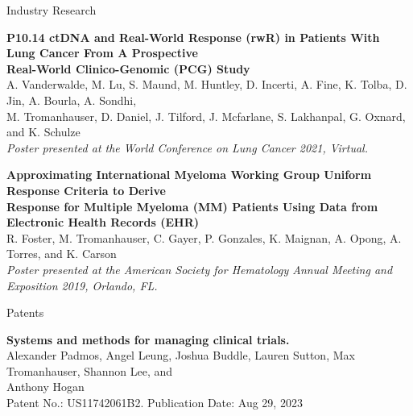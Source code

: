 \documentclass{resume} %
\begin{document}
\begin{grouping}{Industry Research}

\item {\bf P10.14 ctDNA and Real-World Response (rwR) in Patients With Lung Cancer From A Prospective} \\
    {\bf Real-World Clinico-Genomic (PCG) Study} \\
    A. Vanderwalde, M. Lu, S. Maund, M. Huntley, D. Incerti, A. Fine, K. Tolba, D. Jin, A.
    Bourla, A. Sondhi, \\
    M. Tromanhauser, D. Daniel, J. Tilford, J. Mcfarlane, S. Lakhanpal, G. Oxnard,
    and K. Schulze \\
    {\em Poster presented at the World Conference on Lung Cancer 2021, Virtual.}
    \iffalse
    \begin{items}
        \item One of two engineers building data infrastructure for real-world clinical study.
        \item Designed and implemented tool for communicating with participating clinics.
    \end{items}
\fi

\item {\bf Approximating International Myeloma Working Group Uniform Response Criteria to Derive} \\
    {\bf Response for Multiple Myeloma (MM) Patients Using Data from Electronic Health
    Records (EHR)} \\
    R. Foster, M. Tromanhauser, C. Gayer, P. Gonzales, K. Maignan, A. Opong, A. Torres, and K. Carson \\
    {\em Poster presented at the American Society for Hematology Annual Meeting and Exposition
    2019, Orlando, FL.}
\iffalse
    \begin{items}
        \item Implemented and iterated on heuristic for deriving clinical events from lab data.
        \item Wrote findings for abstract and conference poster alongside co-author.
    \end{items}
\fi

\end{grouping}


\begin{grouping}{Patents}

\item {\bf Systems and methods for managing clinical trials.} \\
    Alexander Padmos, Angel Leung, Joshua Buddle, Lauren Sutton, Max Tromanhauser, Shannon
    Lee, and \\ Anthony Hogan \\
    {Patent No.: US11742061B2. Publication Date: Aug 29, 2023}

\end{grouping}
\end{document}
